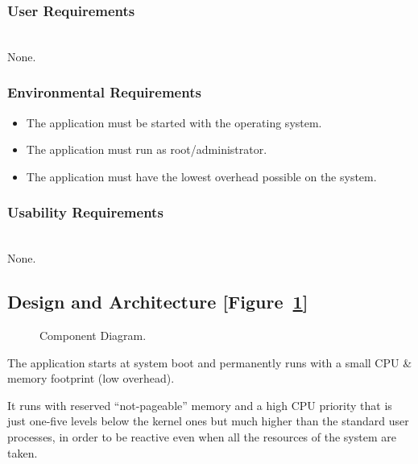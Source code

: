 \documentclass[conference]{IEEEtran}
\begin{document}
\subsubsection{User Requirements} ~\\
None.
\subsubsection{Environmental Requirements}
\begin{itemize}
\item The application must be started with the operating system.
\item The application must run as root/administrator.
\item The application must have the lowest overhead possible on the system.
\end{itemize}
\subsubsection{Usability Requirements} ~\\
None.

\subsection{Design and Architecture [Figure~\ref{componentDiagramFull}]}

\begin{figure}[!tbp]
\caption{Component Diagram.\label{componentDiagramFull}}
\end{figure}

The application starts at system boot and permanently runs with a small CPU \& memory footprint (low overhead).

It runs with reserved “not-pageable” memory and a high CPU priority that is just one-five levels below the kernel ones but much higher than the standard user processes, in order to be reactive even when all the resources of the system are taken.
\end{document}
